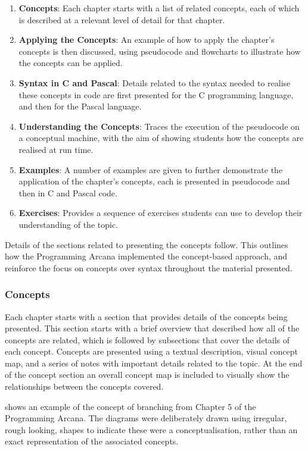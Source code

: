\begin{enumerate}
  \item \textbf{Concepts}: Each chapter starts with a list of related concepts, each of which is described at a relevant level of detail for that chapter.
  \item \textbf{Applying the Concepts}: An example of how to apply the chapter's concepts is then discussed, using pseudocode and flowcharts to illustrate how the concepts can be applied.
  \item \textbf{Syntax in C and Pascal}: Details related to the syntax needed to realise these concepts in code are first presented for the C programming language, and then for the Pascal language.
  \item \textbf{Understanding the Concepts}: Traces the execution of the pseudocode on a conceptual machine, with the aim of showing students how the concepts are realised at run time. 
  \item \textbf{Examples}: A number of examples are given to further demonstrate the application of the chapter's concepts, each is presented in pseudocode and then in C and Pascal code.
  \item \textbf{Exercises}: Provides a sequence of exercises students can use to develop their understanding of the topic.
\end{enumerate}

Details of the sections related to presenting the concepts follow. This outlines how the Programming Arcana implemented the concept-based approach, and reinforce the focus on concepts over syntax throughout the material presented. 

\clearpage
\subsubsection{Concepts} %
\label{par:concepts}

Each chapter starts with a section that provides details of the concepts being presented. This section starts with a brief overview that described how all of the concepts are related, which is followed by subsections that cover the details of each concept. Concepts are presented using a textual description, visual concept map, and a series of notes with important details related to the topic. At the end of the concept section an overall concept map is included to visually show the relationships between the concepts covered. 

 shows an example of the concept of branching from Chapter 5 of the Programming Arcana. The diagrams were deliberately drawn using irregular, rough looking, shapes to indicate these were a conceptualisation, rather than an exact representation of the associated concepts.

